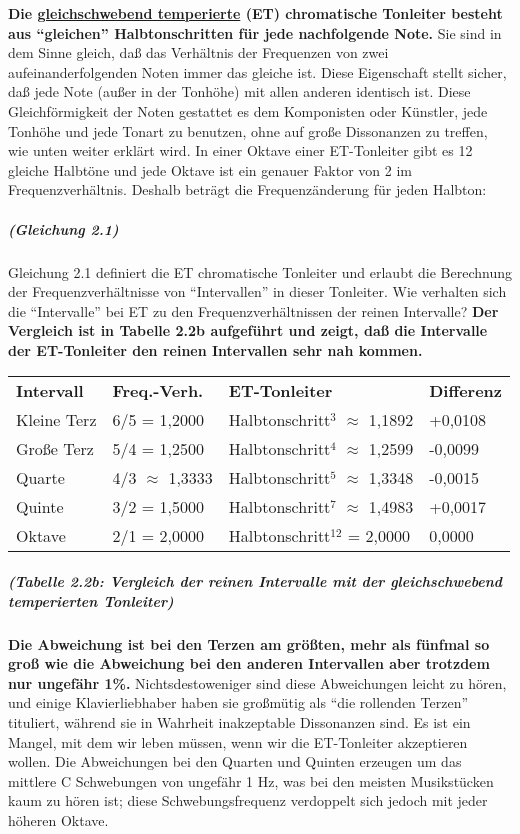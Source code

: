 \textbf{Die \hyperlink{et}{gleichschwebend temperierte} (ET) chromatische Tonleiter besteht aus \enquote{gleichen} Halbtonschritten für jede nachfolgende Note.}
 Sie sind in dem Sinne gleich, daß das Verhältnis der Frequenzen von zwei aufeinanderfolgenden Noten immer das gleiche ist.
 Diese Eigenschaft stellt sicher, daß jede Note (außer in der Tonhöhe) mit allen anderen identisch ist.
 Diese Gleichförmigkeit der Noten gestattet es dem Komponisten oder Künstler, jede Tonhöhe und jede Tonart zu benutzen, ohne auf große Dissonanzen zu treffen, wie unten weiter erklärt wird.
 In einer Oktave einer ET-Tonleiter gibt es 12 gleiche Halbtöne und jede Oktave ist ein genauer Faktor von 2 im Frequenzverhältnis.
 Deshalb beträgt die Frequenzänderung für jeden Halbton:
 \hypertarget{gleich21}{}

\subparagraph{(Gleichung 2.1)}

Gleichung 2.1 definiert die ET chromatische Tonleiter und erlaubt die Berechnung der Frequenzverhältnisse von \enquote{Intervallen} in dieser Tonleiter.
 Wie verhalten sich die \enquote{Intervalle} bei ET zu den Frequenzverhältnissen der reinen Intervalle?
 \textbf{Der Vergleich ist in Tabelle 2.2b aufgeführt und zeigt, daß die Intervalle der ET-Tonleiter den reinen Intervallen sehr nah kommen.}
\begin{tabular}{llll}
\textbf{Intervall} & \textbf{Freq.-Verh.} & \textbf{ET-Tonleiter} & \textbf{Differenz} \\ 
Kleine Terz & 6/5 = 1,2000 & Halbtonschritt$^3$ $\approx$ 1,1892 & +0,0108 \\ 
Große Terz & 5/4 = 1,2500 & Halbtonschritt$^4$ $\approx$ 1,2599 & -0,0099 \\ 
Quarte & 4/3 $\approx$ 1,3333 & Halbtonschritt$^5$ $\approx$ 1,3348 & -0,0015 \\ 
Quinte & 3/2 = 1,5000 & Halbtonschritt$^7$ $\approx$ 1,4983 & +0,0017 \\ 
Oktave & 2/1 = 2,0000 & Halbtonschritt$^12$ = 2,0000 & 0,0000
\end{tabular}

\subparagraph{(Tabelle 2.2b: Vergleich der reinen Intervalle mit der gleichschwebend temperierten Tonleiter)}

\textbf{Die Abweichung ist bei den Terzen am größten, mehr als fünfmal so groß wie die Abweichung bei den anderen Intervallen aber trotzdem nur ungefähr 1\%.}
 Nichtsdestoweniger sind diese Abweichungen leicht zu hören, und einige Klavierliebhaber haben sie großmütig als \enquote{die rollenden Terzen} tituliert, während sie in Wahrheit inakzeptable Dissonanzen sind.
 Es ist ein Mangel, mit dem wir leben müssen, wenn wir die ET-Tonleiter akzeptieren wollen.
 Die Abweichungen bei den Quarten und Quinten erzeugen um das mittlere C Schwebungen von ungefähr 1 Hz, was bei den meisten Musikstücken kaum zu hören ist; diese Schwebungsfrequenz verdoppelt sich jedoch mit jeder höheren Oktave.
 


